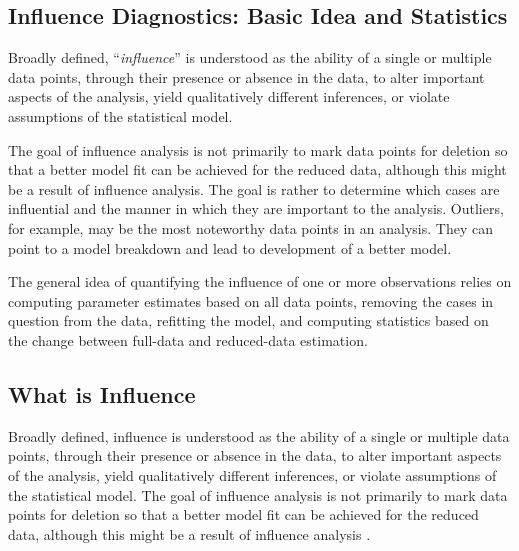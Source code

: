 \documentclass[Main.tex]{subfiles}
\begin{document}
\subsection{Influence Diagnostics: Basic Idea and Statistics} %
Broadly defined, ``\textit{influence}” is understood as the ability of a single or multiple data points, through their presence or absence in the data, to alter important aspects of the analysis, yield qualitatively different inferences, or
		violate assumptions of the statistical model. 
		
		
		The goal of influence analysis is not primarily to mark data
		points for deletion so that a better model fit can be achieved for the reduced data, although this might be a
		result of influence analysis. The goal is rather to determine which cases are influential and the manner in
		which they are important to the analysis. Outliers, for example, may be the most noteworthy data points in
		an analysis. They can point to a model breakdown and lead to development of a better model.
		
		
		The general idea of quantifying the influence of one or more observations relies on computing parameter estimates based on all data points, removing the cases in question from the data, refitting the model, and computing statistics based on the change between full-data and reduced-data estimation. 

			\newpage

\subsection{What is Influence} %

Broadly defined, influence is understood as the ability of a single or multiple data points, through their presence or absence in the data, to alter important aspects of the analysis, yield qualitatively different inferences, or violate assumptions of the statistical model. The goal of influence analysis is not primarily to mark data
points for deletion so that a better model fit can be achieved for the reduced data, although this might be a result of influence analysis \citep{schabenberger}.
\end{document}
